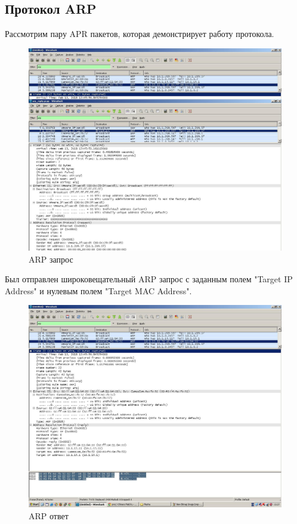 \documentclass[14pt,a4paper,report]{report}
\begin{document}
\subsection{Протокол ARP}

Рассмотрим пару APR пакетов, которая демонстрирует работу протокола.

\begin{figure}[h!]
	\centering
	\includegraphics[scale =  0.4]{images/arp1.JPG}
	
	\caption{ARP запрос}
	\label{image:13}
\end{figure}

Был отправлен широковещательный ARP запрос с заданным полем "Target IP Address" и нулевым полем "Target MAC Address". 

\begin{figure}[h!]
	\centering
	\includegraphics[scale = 0.4]{images/arp2.JPG}
	
	\caption{ARP ответ}
	\label{image:14}
\end{figure}
\end{document}
